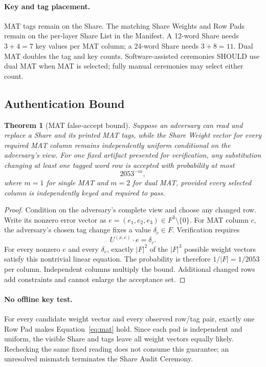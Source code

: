 \documentclass[11pt]{article}
\newtheorem{theorem}{Theorem}[subsection]
\begin{document}
\paragraph{Key and tag placement.} MAT tags remain on the Share. The matching Share Weights and Row Pads remain on the per-layer Share List in the Manifest. A 12-word Share needs $3+4=7$ key values per MAT column; a 24-word Share needs $3+8=11$. Dual MAT doubles the tag and key counts. Software-assisted ceremonies SHOULD use dual MAT when MAT is selected; fully manual ceremonies may select either count.

\subsection{Authentication Bound}

\begin{theorem}[MAT false-accept bound]
\label{thm:mat-forgery}
Suppose an adversary can read and replace a Share and its printed MAT tags, while the Share Weight vector for every required MAT column remains independently uniform conditional on the adversary's view. For one fixed artifact presented for verification, any substitution changing at least one tagged word row is accepted with probability at most
\[
    2053^{-m},
\]
where $m=1$ for single MAT and $m=2$ for dual MAT, provided every selected column is independently keyed and required to pass.
\end{theorem}

\begin{proof}
Condition on the adversary's complete view and choose any changed row. Write its nonzero error vector as $e=(e_1,e_2,e_3)\in F^3\setminus\{0\}$. For MAT column $c$, the adversary's chosen tag change fixes a value $\delta_c\in F$. Verification requires
\[
    U^{(x,c)}\cdot e=\delta_c.
\]
For every nonzero $e$ and every $\delta_c$, exactly $|F|^2$ of the $|F|^3$ possible weight vectors satisfy this nontrivial linear equation. The probability is therefore $1/|F|=1/2053$ per column. Independent columns multiply the bound. Additional changed rows add constraints and cannot enlarge the acceptance set.
\end{proof}

\paragraph{No offline key test.} For every candidate weight vector and every observed row/tag pair, exactly one Row Pad makes Equation~\eqref{eq:mat} hold. Since each pad is independent and uniform, the visible Share and tags leave all weight vectors equally likely. Rechecking the same fixed reading does not consume this guarantee; an unresolved mismatch terminates the Share Audit Ceremony.
\end{document}
